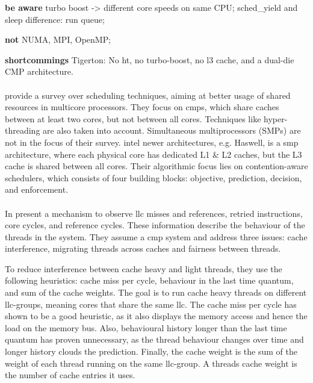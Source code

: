 \textbf{be aware} turbo boost -> different core speeds on same CPU;
sched\_yield and sleep difference: run queue;

\textbf{not} NUMA, MPI, OpenMP;

\textbf{shortcommings} Tigerton: No \gls{ht}, no turbo-boost, no l3 cache,
and a dual-die CMP architecture.


\paragraph{ \cite{zhuravlev_survey_2012} }
\citeauthor{zhuravlev_survey_2012} provide a survey over scheduling techniques,
aiming at better usage of shared resources in multicore processors.
They focus on \gls{cmp}s, which share caches between at
least two cores, but not between all cores.
Techniques like hyper-threading are also taken into account.
Simultaneous multiprocessors (SMPs) are not in the focus of their survey.
\gls{intel} newer architectures, e.g. Haswell, is a \gls{smp} architecture, where each
physical core has dedicated L1 \& L2 caches, but the L3 cache is shared between
all cores.
Their algorithmic focus lies on contention-aware schedulers, which consists of
four building blocks: objective, prediction, decision, and enforcement.


\paragraph{ \cite{knauerhase_using_2008} }
In  \citeauthor{knauerhase_using_2008} present
a mechanism to observe \gls{llc} misses and references, retried instructions,
core cycles, and reference cycles.
These information describe the behaviour of the threads in the system.
They assume a \gls{cmp} system and address three issues: cache interference,
migrating threads across caches and fairness between threads.

To reduce interference between cache heavy and light threads, they use the
following heuristics: cache miss per cycle, behaviour in the last time quantum,
and sum of the cache weights.
The goal is to run cache heavy threads on different \gls{llc}-groups, meaning
cores that share the same \gls{llc}.
The cache miss per cycle has shown to be a good heuristic, as it also displays
the memory access and hence the load on the memory bus.
Also, behavioural history longer than the last time quantum has proven
unnecessary, as the thread behaviour changes over time and longer history
clouds the prediction.
Finally, the cache weight is the sum of the weight of each thread running on
the same \gls{llc}-group.
A threads cache weight is the number of cache entries it uses. 

